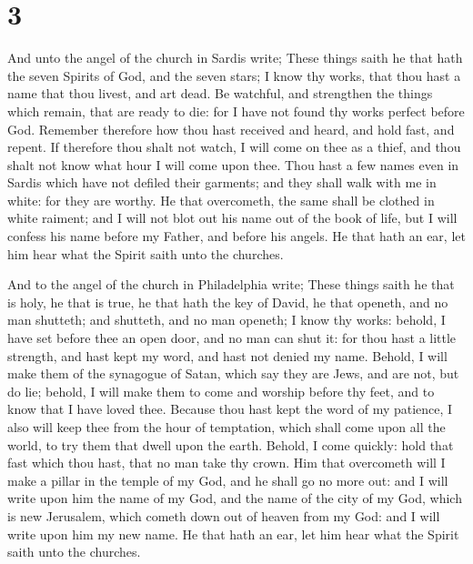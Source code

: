 \hypertarget{section-2}{%
\section{3}\label{section-2}}

 And unto the angel of the church in Sardis write; These
things saith he that hath the seven Spirits of God, and the seven stars;
I know thy works, that thou hast a name that thou livest, and art dead.
 Be watchful, and strengthen the things which remain, that
are ready to die: for I have not found thy works perfect before God.
 Remember therefore how thou hast received and heard, and
hold fast, and repent. If therefore thou shalt not watch, I will come on
thee as a thief, and thou shalt not know what hour I will come upon
thee.  Thou hast a few names even in Sardis which have not
defiled their garments; and they shall walk with me in white: for they
are worthy.  He that overcometh, the same shall be clothed
in white raiment; and I will not blot out his name out of the book of
life, but I will confess his name before my Father, and before his
angels.  He that hath an ear, let him hear what the Spirit
saith unto the churches.

 And to the angel of the church in Philadelphia write;
These things saith he that is holy, he that is true, he that hath the
key of David, he that openeth, and no man shutteth; and shutteth, and no
man openeth;  I know thy works: behold, I have set before
thee an open door, and no man can shut it: for thou hast a little
strength, and hast kept my word, and hast not denied my name.
 Behold, I will make them of the synagogue of Satan, which
say they are Jews, and are not, but do lie; behold, I will make them to
come and worship before thy feet, and to know that I have loved thee.
 Because thou hast kept the word of my patience, I also
will keep thee from the hour of temptation, which shall come upon all
the world, to try them that dwell upon the earth. 
Behold, I come quickly: hold that fast which thou hast, that no man take
thy crown.  Him that overcometh will I make a pillar in
the temple of my God, and he shall go no more out: and I will write upon
him the name of my God, and the name of the city of my God, which is new
Jerusalem, which cometh down out of heaven from my God: and I will write
upon him my new name.  He that hath an ear, let him hear
what the Spirit saith unto the churches.

